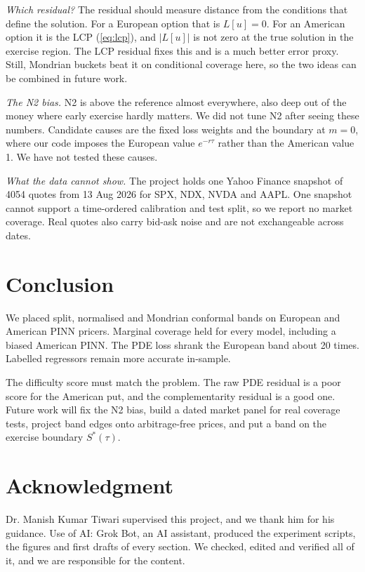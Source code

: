 \documentclass[conference]{IEEEtran}
\begin{document}
\emph{Which residual?} The residual should measure distance from the conditions that define the solution. For a European option that is $L[u]=0$. For an American option it is the LCP (\ref{eq:lcp}), and $|L[u]|$ is not zero at the true solution in the exercise region. The LCP residual fixes this and is a much better error proxy. Still, Mondrian buckets beat it on conditional coverage here, so the two ideas can be combined in future work.

\emph{The N2 bias.} N2 is above the reference almost everywhere, also deep out of the money where early exercise hardly matters. We did not tune N2 after seeing these numbers. Candidate causes are the fixed loss weights and the boundary at $m=0$, where our code imposes the European value $e^{-r\tau}$ rather than the American value 1. We have not tested these causes.

\emph{What the data cannot show.} The project holds one Yahoo Finance snapshot of 4054 quotes from 13 Aug 2026 for SPX, NDX, NVDA and AAPL. One snapshot cannot support a time-ordered calibration and test split, so we report no market coverage. Real quotes also carry bid-ask noise and are not exchangeable across dates.

\section{Conclusion}
We placed split, normalised and Mondrian conformal bands on European and American PINN pricers. Marginal coverage held for every model, including a biased American PINN. The PDE loss shrank the European band about 20 times. Labelled regressors remain more accurate in-sample.

The difficulty score must match the problem. The raw PDE residual is a poor score for the American put, and the complementarity residual is a good one. Future work will fix the N2 bias, build a dated market panel for real coverage tests, project band edges onto arbitrage-free prices, and put a band on the exercise boundary $S^*(\tau)$.

\section*{Acknowledgment}
Dr. Manish Kumar Tiwari supervised this project, and we thank him for his guidance. Use of AI: Grok Bot, an AI assistant, produced the experiment scripts, the figures and first drafts of every section. We checked, edited and verified all of it, and we are responsible for the content.



\end{document}
